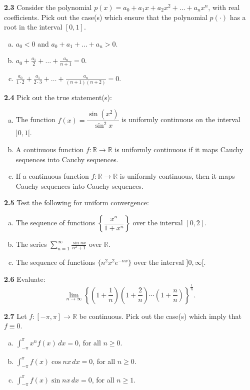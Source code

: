 \documentclass[11pt,a4paper]{article}
\newcommand{\R}{\mathbb{R}}
\newcommand{\qitem}[1]{\par\medskip\noindent\textbf{#1}\hspace{0.5em}}
\begin{document}
\qitem{2.3} Consider the polynomial $p(x) = a_0 + a_1 x + a_2 x^2 + \dots + a_n x^n$, with real coefficients. Pick out the case(s) which ensure that the polynomial $p(\cdot)$ has a root in the interval $[0, 1]$.
\begin{enumerate}[(a)]
  \item $a_0 < 0$ and $a_0 + a_1 + \dots + a_n > 0$.
  \item $\displaystyle a_0 + \frac{a_1}{2} + \dots + \frac{a_n}{n+1} = 0$.
  \item $\displaystyle \frac{a_0}{1\cdot 2} + \frac{a_1}{2\cdot 3} + \dots + \frac{a_n}{(n+1)(n+2)} = 0$.
\end{enumerate}

\qitem{2.4} Pick out the true statement(s):
\begin{enumerate}[(a)]
  \item The function $f(x) = \dfrac{\sin(x^2)}{\sin^2 x}$ is uniformly continuous on the interval $]0, 1[$.
  \item A continuous function $f : \R \to \R$ is uniformly continuous if it maps Cauchy sequences into Cauchy sequences.
  \item If a continuous function $f : \R \to \R$ is uniformly continuous, then it maps Cauchy sequences into Cauchy sequences.
\end{enumerate}

\qitem{2.5} Test the following for uniform convergence:
\begin{enumerate}[(a)]
  \item The sequence of functions $\left\{\dfrac{x^n}{1+x^n}\right\}$ over the interval $[0, 2]$.
  \item The series $\displaystyle\sum_{n=1}^{\infty} \frac{\sin nx}{n^2 + 1}$ over $\R$.
  \item The sequence of functions $\{n^2 x^2 e^{-nx}\}$ over the interval $]0, \infty[$.
\end{enumerate}

\qitem{2.6} Evaluate:
\[
  \lim_{n \to \infty} \left\{\left(1 + \frac{1}{n}\right)\left(1 + \frac{2}{n}\right)\cdots\left(1 + \frac{n}{n}\right)\right\}^{\frac{1}{n}}.
\]

\qitem{2.7} Let $f : [-\pi, \pi] \to \R$ be continuous. Pick out the case(s) which imply that $f \equiv 0$.
\begin{enumerate}[(a)]
  \item $\displaystyle\int_{-\pi}^{\pi} x^n f(x)\,dx = 0$, for all $n \ge 0$.
  \item $\displaystyle\int_{-\pi}^{\pi} f(x)\cos nx\,dx = 0$, for all $n \ge 0$.
  \item $\displaystyle\int_{-\pi}^{\pi} f(x)\sin nx\,dx = 0$, for all $n \ge 1$.
\end{enumerate}
\end{document}
